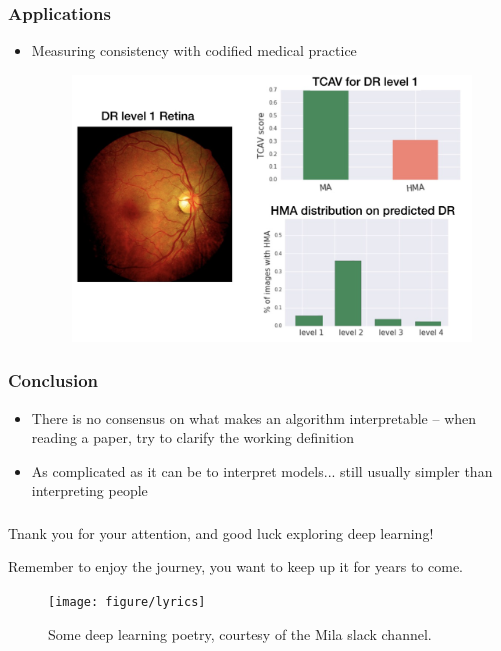 \documentclass[10pt,mathserif]{beamer}
\begin{document}
\begin{frame}
  \frametitle{Applications}
  \begin{itemize}
  \item Measuring consistency with codified medical practice
    \begin{figure}[ht]
      \centering
      \includegraphics[width=0.7\paperwidth]{figure/cav_app1}
    \end{figure}
  \end{itemize}  
\end{frame}

\begin{frame}
  \frametitle{Conclusion}
\begin{itemize}
\item There is no consensus on what makes an algorithm interpretable -- when
  reading a paper, try to clarify the working definition
\item As complicated as it can be to interpret models... still usually simpler
  than interpreting people
\end{itemize}
\end{frame}

\begin{frame}
  \frametitle{}
 Tnank you for your attention, and good luck exploring deep learning!

 Remember to enjoy the journey, you want to keep up it for years to come.
\begin{figure}
  \centering
  \texttt{[image: figure/lyrics]}
  \caption{Some deep learning poetry, courtesy of the Mila slack
    channel.\label{fig:label} }
\end{figure}

\end{frame}


\end{document}
